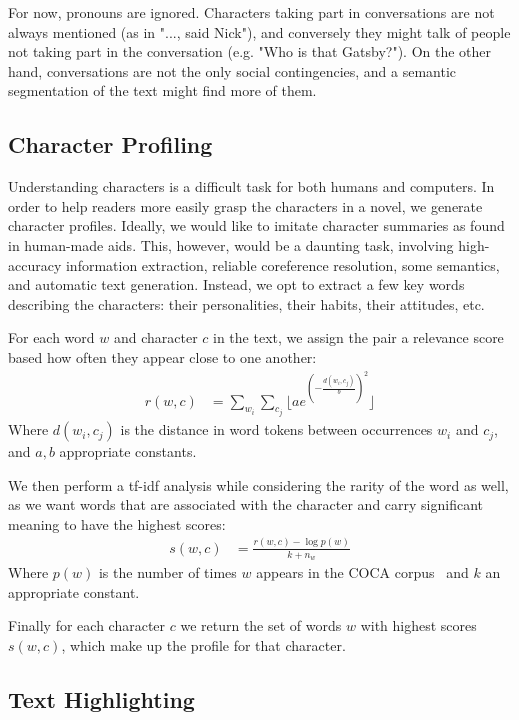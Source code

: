 \documentclass[twoside]{article}
\begin{document}
\begin{multicols}{2}
For now, pronouns are ignored. Characters taking part in conversations are not always mentioned (as in "..., said Nick"), and conversely they might talk of people not taking part in the conversation (e.g. "Who is that Gatsby?"). On the other hand, conversations are not the only social contingencies, and a semantic segmentation of the text might find more of them.


\subsection{Character Profiling}

Understanding characters is a difficult task for both humans and computers. In order to help readers more easily grasp the characters in a novel, we generate character profiles. Ideally, we would like to imitate character summaries as found in human-made aids. This, however, would be a daunting task, involving high-accuracy information extraction, reliable coreference resolution, some semantics, and automatic text generation. 
Instead, we opt to extract a few key words describing the characters: their personalities, their habits, their attitudes, etc.

For each word $w$ and character $c$ in the text, we assign the pair a relevance score based how often they appear close to one another:
\begin{align*}
r(w,c) &= \sum_{w_i} \sum_{c_j} \lfloor ae^{\left(-\frac{d(w_i, c_j)}{b}\right)^2}\rfloor
\end{align*}
Where $d(w_i, c_j)$ is the distance in word tokens between occurrences $w_i$ and $c_j$, and $a, b$ appropriate constants. 

We then perform a tf-idf analysis while considering the rarity of the word as well, as we want words that are associated with the character and carry significant meaning to have the highest scores:
\begin{align*}
s(w,c) &= \frac{r(w,c) - \log{p(w)}}{k + n_w}
\end{align*}
Where $p(w)$ is the number of times $w$ appears in the COCA corpus~\cite{wang2008good} and $k$ an appropriate constant. 

Finally for each character $c$ we return the set of words $w$ with highest scores $s(w,c)$, which make up the profile for that character.

\subsection{Text Highlighting}


\end{multicols}
\end{document}
